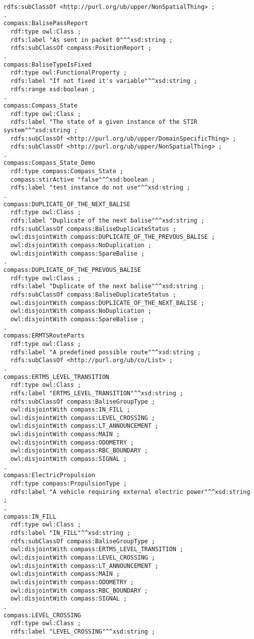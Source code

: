 \begin{frame}[fragile]
\begin{lstlisting}[float=b,language=sparql,frame=tb,caption={Mapping of RaCoOn to COMPASS project data},label=lst:racooncompassmap]
  rdfs:subClassOf <http://purl.org/ub/upper/NonSpatialThing> ;
.
compass:BalisePassReport
  rdf:type owl:Class ;
  rdfs:label "As sent in packet 0"^^xsd:string ;
  rdfs:subClassOf compass:PositionReport ;
.
compass:BaliseTypeIsFixed
  rdf:type owl:FunctionalProperty ;
  rdfs:label "If not fixed it's variable"^^xsd:string ;
  rdfs:range xsd:boolean ;
.
compass:Compass_State
  rdf:type owl:Class ;
  rdfs:label "The state of a given instance of the STIR system"^^xsd:string ;
  rdfs:subClassOf <http://purl.org/ub/upper/DomainSpecificThing> ;
  rdfs:subClassOf <http://purl.org/ub/upper/NonSpatialThing> ;
.
compass:Compass_State_Demo
  rdf:type compass:Compass_State ;
  compass:stirActive "false"^^xsd:boolean ;
  rdfs:label "test instance do not use"^^xsd:string ;
.
compass:DUPLICATE_OF_THE_NEXT_BALISE
  rdf:type owl:Class ;
  rdfs:label "Duplicate of the next balise"^^xsd:string ;
  rdfs:subClassOf compass:BaliseDuplicateStatus ;
  owl:disjointWith compass:DUPLICATE_OF_THE_PREVOUS_BALISE ;
  owl:disjointWith compass:NoDuplication ;
  owl:disjointWith compass:SpareBalise ;
.
compass:DUPLICATE_OF_THE_PREVOUS_BALISE
  rdf:type owl:Class ;
  rdfs:label "Duplicate of the next balise"^^xsd:string ;
  rdfs:subClassOf compass:BaliseDuplicateStatus ;
  owl:disjointWith compass:DUPLICATE_OF_THE_NEXT_BALISE ;
  owl:disjointWith compass:NoDuplication ;
  owl:disjointWith compass:SpareBalise ;
.
compass:ERMTSRouteParts
  rdf:type owl:Class ;
  rdfs:label "A predefined possible route"^^xsd:string ;
  rdfs:subClassOf <http://purl.org/ub/co/List> ;
.
compass:ERTMS_LEVEL_TRANSITION
  rdf:type owl:Class ;
  rdfs:label "ERTMS_LEVEL_TRANSITION"^^xsd:string ;
  rdfs:subClassOf compass:BaliseGroupType ;
  owl:disjointWith compass:IN_FILL ;
  owl:disjointWith compass:LEVEL_CROSSING ;
  owl:disjointWith compass:LT_ANNOUNCEMENT ;
  owl:disjointWith compass:MAIN ;
  owl:disjointWith compass:ODOMETRY ;
  owl:disjointWith compass:RBC_BOUNDARY ;
  owl:disjointWith compass:SIGNAL ;
.
compass:ElectricPropulsion
  rdf:type compass:PropulsionType ;
  rdfs:label "A vehicle requiring external electric power"^^xsd:string ;
.
compass:IN_FILL
  rdf:type owl:Class ;
  rdfs:label "IN_FILL"^^xsd:string ;
  rdfs:subClassOf compass:BaliseGroupType ;
  owl:disjointWith compass:ERTMS_LEVEL_TRANSITION ;
  owl:disjointWith compass:LEVEL_CROSSING ;
  owl:disjointWith compass:LT_ANNOUNCEMENT ;
  owl:disjointWith compass:MAIN ;
  owl:disjointWith compass:ODOMETRY ;
  owl:disjointWith compass:RBC_BOUNDARY ;
  owl:disjointWith compass:SIGNAL ;
.
compass:LEVEL_CROSSING
  rdf:type owl:Class ;
  rdfs:label "LEVEL_CROSSING"^^xsd:string ;

\end{lstlisting}
\end{frame}
